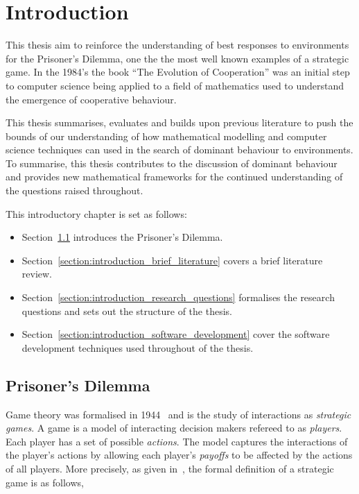 \chapter{Introduction}

This thesis aim to reinforce the understanding of best responses to environments
for the Prisoner's Dilemma, one the the most well known examples of a strategic
game. In the 1984's the book ``The Evolution of Cooperation'' was an initial
step to computer science being applied to  a field of mathematics used to
understand the emergence of cooperative behaviour.

This thesis summarises, evaluates and builds upon previous literature to
push the bounds of our understanding of how mathematical modelling and
computer science techniques can used in the search of dominant
behaviour to environments. To summarise, this thesis contributes to the discussion
of dominant behaviour and provides new mathematical frameworks for the continued
understanding of the questions raised throughout.

This introductory chapter is set as follows:

\begin{itemize}
    \item Section~\ref{section:introduction_prisoners_dilemma} introduces
    the Prisoner's Dilemma.
    \item Section~\ref{section:introduction_brief_literature} covers a brief
    literature review.
    \item Section~\ref{section:introduction_research_questions} formalises the research
    questions and sets out the structure of the thesis.
    \item Section~\ref{section:introduction_software_development} cover the
    software development techniques used throughout of the thesis.
\end{itemize}

\section{Prisoner's Dilemma}\label{section:introduction_prisoners_dilemma}

Game theory was formalised in 1944~\cite{VonNeumann1944} and is the study of
interactions as \textit{strategic games}. A game is a model of interacting
decision makers refereed to as \textit{players}. Each player has a set of
possible \textit{actions}. The model captures the interactions of the player's
actions by allowing each player's \textit{payoffs} to be affected by the actions
of all players. More precisely, as given in~\cite{Osborne2004}, the formal
definition of a strategic game is as follows,

